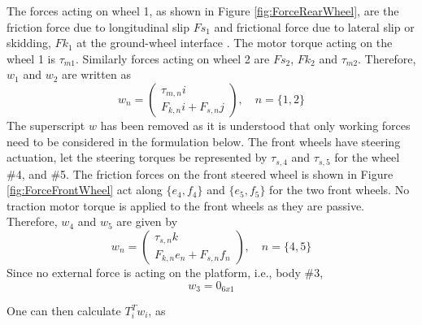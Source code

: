 The forces acting on wheel 1, as shown in Figure \ref{fig:ForceRearWheel},  are the friction force due to longitudinal slip $Fs_1$ and frictional force  due to lateral slip or skidding, $Fk_1$ at the ground-wheel interface . The motor torque acting on the wheel 1 is $\tau_{m1}$.  Similarly forces acting on wheel 2 are $Fs_2$, $Fk_2$ and $\tau_{m2}$. Therefore, $w_1$ and $w_2$ are written as 
\begin{equation}
\label{eqn:wrenchWheelSlipRear}
 w_n=\begin{pmatrix}
\tau_{m,n}i\\
F_{k,n}i+F_{s,n}j
\end{pmatrix},  \quad n=\{1,2\}
\end{equation}
The superscript $w$ has been removed as it is understood that only working forces need to be considered in the formulation below. 
The front wheels have steering actuation, let the steering  torques be represented by $\tau_{s,4}$ and  $\tau_{s,5}$ for the wheel \#4, and \#5. The friction forces on the front steered wheel is shown in Figure \ref{fig:ForceFrontWheel} act along $\{e_4,f_4\}$ and $\{e_5,f_5\}$ for the two front wheels. No traction motor torque is applied to the front wheels as they are passive. Therefore, $w_4$ and $w_5$ are given by
\begin{equation}
\label{eqn:wrenchWheelSlipFront}
w_n=\begin{pmatrix}
\tau_{s,n}k\\
F_{k,n}e_n+F_{s,n}f_n
\end{pmatrix},  \quad n=\{4,5\}
\end{equation}
Since no external force is acting on the platform, i.e., body \#3, \[w_3=0_{6x1}\]

One can then calculate $T_i^Tw_i$, as


